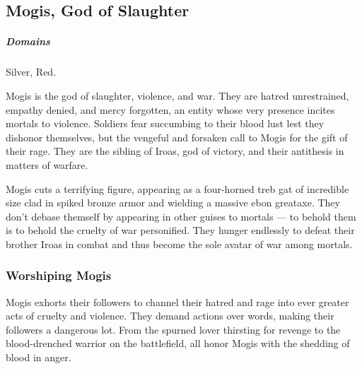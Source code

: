 %

\subsection*{Mogis, God of Slaughter} \label{ssec::mogis}
    \subparagraph{Domains} Silver, Red.

    Mogis is the god of slaughter, violence, and war.
    They are hatred unrestrained, empathy denied, and mercy forgotten, an entity whose very presence incites mortals to violence.
    Soldiers fear succumbing to their blood lust lest they dishonor themselves, but the vengeful and forsaken call to Mogis for the gift of their rage.
    They are the sibling of Iroas, god of victory, and their antithesis in matters of warfare.


    Mogis cuts a terrifying figure, appearing as a four-horned treb gat of incredible size clad in spiked bronze armor and wielding a massive ebon greataxe.
    They don't debase themself by appearing in other guises to mortals --- to behold them is to behold the cruelty of war personified.
    They hunger endlessly to defeat their brother Iroas in combat and thus become the sole avatar of war among mortals.


    \subsubsection{Worshiping Mogis}
        Mogis exhorts their followers to channel their hatred and rage into ever greater acts of cruelty and violence.
        They demand actions over words, making their followers a dangerous lot.
        From the spurned lover thirsting for revenge to the blood-drenched warrior on the battlefield, all honor Mogis with the shedding of blood in anger.

